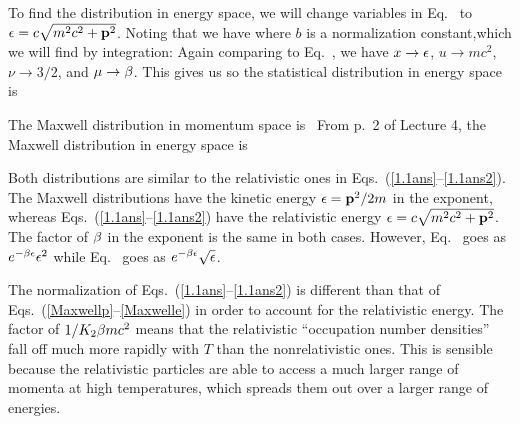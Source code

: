 \documentclass[11pt]{article}
\begin{document}
{	To find the distribution in energy space, we will change variables in Eq.~ to $\epsilon = c \sqrt{m^2 c^2 + \vb{p}^2}$.  Noting that
	we have
	where $b$ is a normalization constant,which we will find by integration:
	Again comparing to Eq.~, we have $x \to \epsilon$, $u \to mc^2$, $\nu \to 3/2$, and $\mu \to \beta$.  This gives us
	so the statistical distribution in energy space is

	
	The Maxwell distribution in momentum space is~\cite[p.~109]{Landau}
	From p.~2 of Lecture 4, the Maxwell distribution in energy space is
	
	Both distributions are similar to the relativistic ones in Eqs.~(\ref{1.1ans}--\ref{1.1ans2}).  The Maxwell distributions have the kinetic energy $\epsilon = \vb{p}^2 / 2m$ in the exponent, whereas Eqs.~(\ref{1.1ans}--\ref{1.1ans2}) have the relativistic energy $\epsilon = c \sqrt{m^2 c^2 + \vb{p}^2}$.  The factor of $\beta$ in the exponent is the same in both cases.  	However, Eq.~ goes as $e^{-\beta \epsilon} \epsilon^2$ while Eq.~ goes as $e^{-\beta \epsilon} \sqrt{\epsilon}$.
	
	The normalization of Eqs.~(\ref{1.1ans}--\ref{1.1ans2}) is different than that of Eqs.~(\ref{Maxwellp}--\ref{Maxwelle}) in order to account for the relativistic energy.  The factor of $1/K_2{\beta mc^2}$ means that the relativistic ``occupation number densities'' fall off much more rapidly with $T$ than the nonrelativistic ones.  This is sensible because the relativistic particles are able to access a much larger range of momenta at high temperatures, which spreads them out over a larger range of energies.
}

%
%
\end{document}
